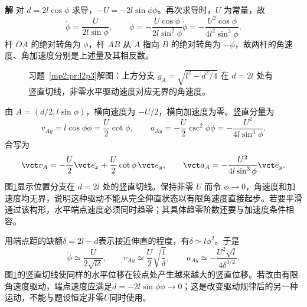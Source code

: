 \documentclass[11pt,openany,fontset=fandol]{ctexbook}
\theoremstyle{definition}\newtheorem{example}{例}[chapter]\newtheorem{exercise}{习题}[chapter]
\newcommand{\SolutionStart}{\par\medskip\ifdim\pagetotal>0pt\ifdim\dimexpr\pagegoal-\pagetotal\relax<3\baselineskip\newpage\fi\fi\noindent\textbf{解}\quad\ignorespaces}
\newenvironment{solution}{\SolutionStart}{\par\medskip}
\begin{document}
\begin{solution}
对 $d=2l\cos\phi$ 求导，$-U=-2l\sin\phi\dot\phi$。再次求导时，$U$ 为常量，故
\[
\dot\phi=\frac{U}{2l\sin\phi},\qquad
\ddot\phi=-\frac{U\cos\phi}{2l\sin^2\phi}\dot\phi
=-\frac{U^2\cos\phi}{4l^2\sin^3\phi}.
\]
杆 $OA$ 的绝对转角为 $\phi$，杆 $AB$ 从 $A$ 指向 $B$ 的绝对转角为 $-\phi$，故两杆的角速度、角加速度分别是上述量及其相反数。

\begin{figure}[H]\centering
{}
\caption{习题~\ref{mp2:pr:l2p3}解图：上方分支 $y_A=\sqrt{l^2-d^2/4}$ 在 $d=2l$ 处有竖直切线，非零水平驱动速度对应无界的角速度。}\label{mp2:fig:l2p3-s}
\end{figure}

由 $A=(d/2,l\sin\phi)$，横向速度为 $-U/2$，横向加速度为零。竖直分量为
\[
v_{Ay}=l\cos\phi\dot\phi=\frac U2\cot\phi,\qquad
a_{Ay}=-\frac U2\csc^2\phi\dot\phi
=-\frac{U^2}{4l\sin^3\phi}.
\]
合写为
\[
\vct v_A=-\frac U2\vct e_x+\frac U2\cot\phi\,\vct e_y,
\qquad
\vct a_A=-\frac{U^2}{4l\sin^3\phi}\vct e_y.
\]
图\ref{mp2:fig:l2p3-s}显示位置分支在 $d=2l$ 处的竖直切线。保持非零 $U$ 而令 $\phi\to0$，角速度和加速度均无界，说明这种驱动不能从完全伸直状态以有限角速度直接起步。若要平滑通过该构形，水平端点速度必须同时趋零；其具体趋零阶数还要与加速度条件相容。

用端点距的缺额$\delta=2l-d$表示接近伸直的程度，有$\delta\simeq l\phi^2$。于是
\[
 \dot\phi\simeq\frac{U}{2\sqrt{l\delta}},\qquad
 v_{Ay}\simeq\frac U2\sqrt{\frac l\delta},\qquad
 a_{Ay}\simeq-\frac{U^2\sqrt l}{4\delta^{3/2}}.
\]
图\ref{mp2:fig:l2p3-s}的竖直切线使同样的水平位移在铰点处产生越来越大的竖直位移。若改由有限角速度驱动，端点速度应满足$\dot d=-2l\sin\phi\dot\phi\to0$；这是改变驱动规律后的另一种运动，不能与题设恒定非零$U$同时使用。
\end{solution}
\end{document}
